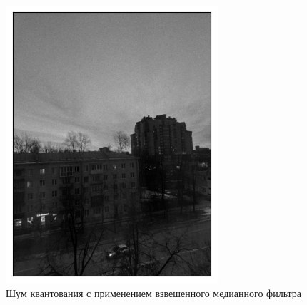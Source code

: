 \documentclass[a4paper,12pt]{article}
\begin{document}
\begin{figure}[H]
\begin{minipage}{0.49\textwidth}
        \centering \includegraphics[width=\textwidth]{results/nlf_pois_2.png}
        \caption{Шум квантования с применением взвешенного медианного фильтра}
    \end{minipage}
\end{figure}
\end{document}
